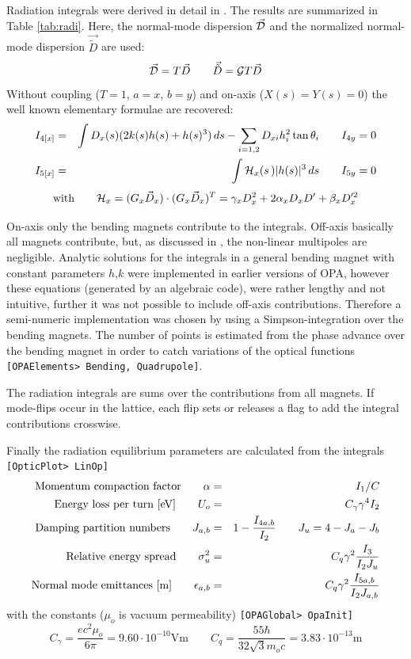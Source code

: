 \documentclass[12pt]{article}
\newcommand\beq{\begin{equation}}
\newcommand\eeq{\end{equation}}
\newcommand{\tilvec}[1]{\vec{\tilde{#1}}}
\newcommand\code[1]{{\tt [#1]}}
\begin{document}
Radiation integrals were derived in detail in \cite{VZAS}. The results are summarized in Table \ref{tab:radi}. Here, the normal-mode dispersion $\vec{\cal D}$ and the normalized normal-mode dispersion $\tilvec{D}$ are used:
\begin{equation}\label{eq:nmodedisp}
\vec{\cal D} =  T\vec{D}\qquad \tilvec{D}= {\cal G} T \vec D
\end{equation}
Without coupling ($T=1$, $a=x$, $b=y$) and on-axis ($X(s)=Y(s)=0$) the well known elementary formulae are recovered:
\begin{eqnarray*}
I_{4[x]} & = &  \int D_x(s) (2k(s)h(s)+h(s)^3)\,ds - \sum_{i=1,2} D_{xi} h_i^2 \tan \theta_i\qquad I_{4y}=0 \\
I_{5[x]} & = & \int {\cal H}_x(s\,)|h(s)|^3 \, ds \qquad I_{5y}=0
\end{eqnarray*}
\[
\mbox{\rm with} \qquad  {\cal H}_x =(G_x \vec{D}_x) \cdot (G_x \vec{D}_x)^T = \gamma_xD_x^2 + 2\alpha_x D_xD' + \beta_xD_x'^2
\]

On-axis only the bending magnets contribute to the integrals. Off-axis basically all magnets contribute, but, as discussed in \cite{VZAS}, the non-linear multipoles are negligible.
Analytic solutions for the integrals in a general bending magnet with constant parameters $h$,$k$ were implemented in earlier versions of OPA, however these equations (generated by an algebraic code), were rather lengthy and not intuitive, further it was not possible to include off-axis contributions. Therefore a semi-numeric implementation was chosen by using a Simpson-integration over the bending magnets. The number of points is estimated from the phase advance over the bending magnet in order to catch variations of the optical functions \code{OPAElements> Bending, Quadrupole}.

The radiation integrals are sums over the contributions from all magnets. If mode-flips occur in the lattice, each flip sets or releases a flag to add the integral contributions crosswise.

Finally the radiation equilibrium parameters are calculated from the integrals \code{OpticPlot> LinOp}
\begin{eqnarray}
\mbox{\rm Momentum compaction factor}   \qquad \alpha & = & I_1/C \\
\mbox{\rm Energy loss per turn [eV]}  \qquad  U_o & = &  C_{\gamma} \gamma^4 I_2 \\
\mbox{\rm Damping partition numbers}  \qquad J_{a,b} & = &  1-\frac{I_{4a,b}}{I_2}\qquad J_u=4-J_a-J_b \\
\mbox{\rm Relative energy spread}  \qquad \sigma_u^2 & = &  C_q\gamma^2\frac{I_3}{I_2 J_u} \\
\mbox{\rm Normal mode emittances [m]}  \qquad \epsilon_{a,b} & = & C_q\gamma^2\frac{I_{5a,b}}{I_2 J_{a,b}}
\end{eqnarray}
with the constants ($\mu_o$ is vacuum permeability) \code{OPAGlobal> OpaInit}
\beq
C_{\gamma}= \frac{ec^2\mu_o}{6\pi} = 9.60\cdot10^{-10} \mbox{Vm} \qquad
C_q = \frac{55 \hbar}{32 \sqrt{3} m_oc} =3.83\cdot10^{-13} \mbox{m}
\eeq
\end{document}
